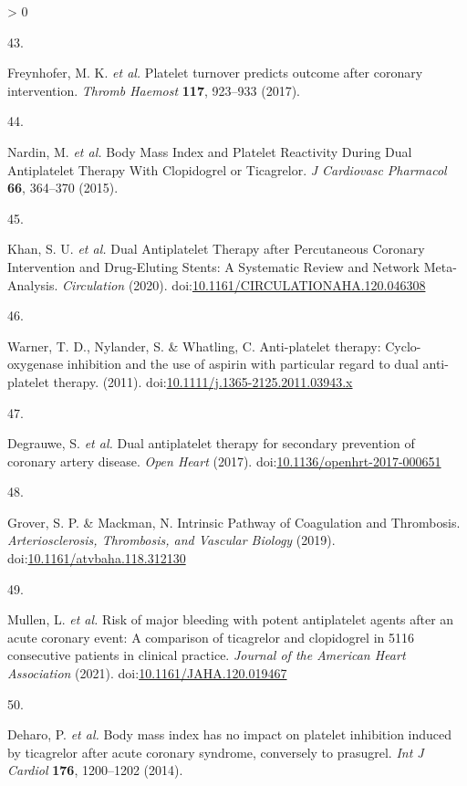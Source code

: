 \documentclass[11pt,twoside]{bristolthesis}
\newlength{\cslhangindent}
\newlength{\csllabelwidth}
\newenvironment{CSLReferences}[2] %
 {%
  \setlength{\parindent}{0pt}
  \ifodd #1 \everypar{\setlength{\hangindent}{\cslhangindent}}\ignorespaces\fi
  \ifnum #2 > 0
  \setlength{\parskip}{#2\baselineskip}
  \fi
 }%
 {}
\newcommand{\CSLLeftMargin}[1]{\parbox[t]{\csllabelwidth}{#1}}
\newcommand{\CSLRightInline}[1]{\parbox[t]{\linewidth - \csllabelwidth}{#1}\break}
\begin{document}
\begin{CSLReferences}{0}{0}
\leavevmode\hypertarget{ref-Freynhofer2017a}{}%
\CSLLeftMargin{43. }
\CSLRightInline{Freynhofer, M. K. \emph{et al.} {Platelet turnover predicts outcome after coronary intervention}. \emph{Thromb Haemost} \textbf{117}, 923--933 (2017).}

\leavevmode\hypertarget{ref-Nardin2015}{}%
\CSLLeftMargin{44. }
\CSLRightInline{Nardin, M. \emph{et al.} {Body Mass Index and Platelet Reactivity During Dual Antiplatelet Therapy With Clopidogrel or Ticagrelor}. \emph{J Cardiovasc Pharmacol} \textbf{66}, 364--370 (2015).}

\leavevmode\hypertarget{ref-Khan2020}{}%
\CSLLeftMargin{45. }
\CSLRightInline{Khan, S. U. \emph{et al.} {Dual Antiplatelet Therapy after Percutaneous Coronary Intervention and Drug-Eluting Stents: A Systematic Review and Network Meta-Analysis}. \emph{Circulation} (2020). doi:\href{https://doi.org/10.1161/CIRCULATIONAHA.120.046308}{10.1161/CIRCULATIONAHA.120.046308}}

\leavevmode\hypertarget{ref-Warner2011}{}%
\CSLLeftMargin{46. }
\CSLRightInline{Warner, T. D., Nylander, S. \& Whatling, C. {Anti-platelet therapy: Cyclo-oxygenase inhibition and the use of aspirin with particular regard to dual anti-platelet therapy}. (2011). doi:\href{https://doi.org/10.1111/j.1365-2125.2011.03943.x}{10.1111/j.1365-2125.2011.03943.x}}

\leavevmode\hypertarget{ref-Degrauwe2017}{}%
\CSLLeftMargin{47. }
\CSLRightInline{Degrauwe, S. \emph{et al.} {Dual antiplatelet therapy for secondary prevention of coronary artery disease}. \emph{Open Heart} (2017). doi:\href{https://doi.org/10.1136/openhrt-2017-000651}{10.1136/openhrt-2017-000651}}

\leavevmode\hypertarget{ref-Grover2019}{}%
\CSLLeftMargin{48. }
\CSLRightInline{Grover, S. P. \& Mackman, N. {Intrinsic Pathway of Coagulation and Thrombosis}. \emph{Arteriosclerosis, Thrombosis, and Vascular Biology} (2019). doi:\href{https://doi.org/10.1161/atvbaha.118.312130}{10.1161/atvbaha.118.312130}}

\leavevmode\hypertarget{ref-Mullen2021}{}%
\CSLLeftMargin{49. }
\CSLRightInline{Mullen, L. \emph{et al.} {Risk of major bleeding with potent antiplatelet agents after an acute coronary event: A comparison of ticagrelor and clopidogrel in 5116 consecutive patients in clinical practice}. \emph{Journal of the American Heart Association} (2021). doi:\href{https://doi.org/10.1161/JAHA.120.019467}{10.1161/JAHA.120.019467}}

\leavevmode\hypertarget{ref-Deharo2014}{}%
\CSLLeftMargin{50. }
\CSLRightInline{Deharo, P. \emph{et al.} {Body mass index has no impact on platelet inhibition induced by ticagrelor after acute coronary syndrome, conversely to prasugrel}. \emph{Int J Cardiol} \textbf{176}, 1200--1202 (2014).}


\end{CSLReferences}
\end{document}
